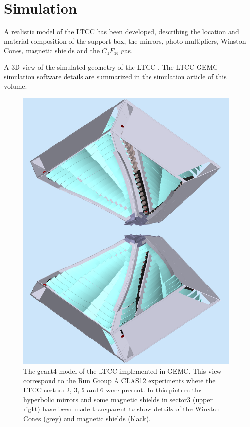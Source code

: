 \section{Simulation}

A realistic model of the LTCC has been developed, describing the location and material composition
of the support box, the mirrors, photo-multipliers, Winston Cones, magnetic shields and the $C_4F_{10}$ gas.

A 3D view of the simulated geometry of the LTCC . The LTCC GEMC simulation software details are summarized in the simulation article of this volume.


\begin{figure}
	\centering
	\includegraphics[width=0.95\columnwidth,keepaspectratio]{img/simOverview.png}
	\caption{The geant4 model of the LTCC implemented in GEMC. This view correspond to the Run Group A CLAS12 experiments
				where the LTCC sectors 2, 3, 5 and 6 were present. In this picture the hyperbolic mirrors and some magnetic shields
            in sector3 (upper right) have been made transparent to show details of the Winston Cones (grey) and magnetic shields (black).}
	\label{fig:simOverview}
\end{figure}

